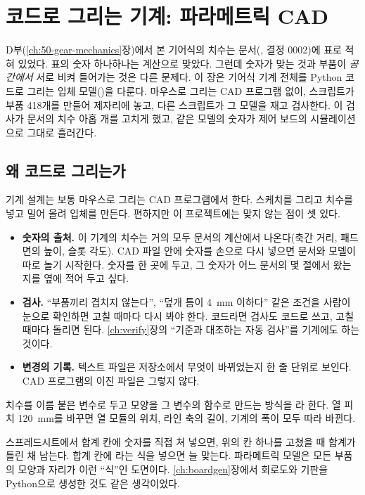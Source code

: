 \chapter{코드로 그리는 기계: 파라메트릭 CAD}\label{ch:51-gear-cad}

D부(\ref{ch:50-gear-mechanics}장)에서 본 기어식의 치수는 문서(, 결정 0002)에 표로 적혀 있었다. 표의 숫자 하나하나는 계산으로
맞았다. 그런데 숫자가 맞는 것과 부품이 \emph{공간에서} 서로 비켜 들어가는 것은 다른 문제다. 이 장은 기어식 기계 전체를
Python 코드로 그리는 입체 모델()을 다룬다. 마우스로 그리는 CAD 프로그램 없이, 스크립트가 부품
418개를 만들어 제자리에 놓고, 다른 스크립트가 그 모델을 재고 검사한다. 이 검사가 문서의 치수 아홉 개를 고치게 했고,
같은 모델의 숫자가 제어 보드의 시뮬레이션으로 그대로 흘러간다.

\section{왜 코드로 그리는가}\label{sec:gc-why}

\Why 기계 설계는 보통 마우스로 그리는 CAD 프로그램에서 한다. 스케치를 그리고 치수를 넣고 밀어 올려 입체를 만든다.
편하지만 이 프로젝트에는 맞지 않는 점이 셋 있다.

\begin{itemize}
\item \textbf{숫자의 출처.} 이 기계의 치수는 거의 모두 문서의 계산에서 나온다(축간 거리, 패드 면의 높이, 슬롯 각도).
CAD 파일 안에 숫자를 손으로 다시 넣으면 문서와 모델이 따로 놀기 시작한다. 숫자를 한 곳에 두고, 그 숫자가 어느 문서의
몇 절에서 왔는지를 옆에 적어 두고 싶다.
\item \textbf{검사.} ``부품끼리 겹치지 않는다'', ``덮개 틈이 4~mm 이하다'' 같은 조건을 사람이 눈으로 확인하면 고칠 때마다
다시 봐야 한다. 코드라면 검사도 코드로 쓰고, 고칠 때마다 돌리면 된다. \ref{ch:verify}장의 ``기준과 대조하는 자동
검사''를 기계에도 하는 것이다.
\item \textbf{변경의 기록.} 텍스트 파일은 저장소에서 무엇이 바뀌었는지 한 줄 단위로 보인다. CAD 프로그램의 이진 파일은
그렇지 않다.
\end{itemize}

치수를 이름 붙은 변수로 두고 모양을 그 변수의 함수로 만드는 방식을 라 한다.
열 피치 120~mm를 바꾸면 열 모듈의 위치, 라인 축의 길이, 기계의 폭이 모두 따라 바뀐다.

\General 스프레드시트에서 합계 칸에 숫자를 직접 쳐 넣으면, 위의 칸 하나를 고쳤을 때 합계가 틀린 채 남는다. 합계 칸에
라는 식을 넣으면 늘 맞는다. 파라메트릭 모델은 모든 부품의 모양과 자리가 이런 ``식''인 도면이다.
\ref{ch:boardgen}장에서 회로도와 기판을 Python으로 생성한 것도 같은 생각이었다.

